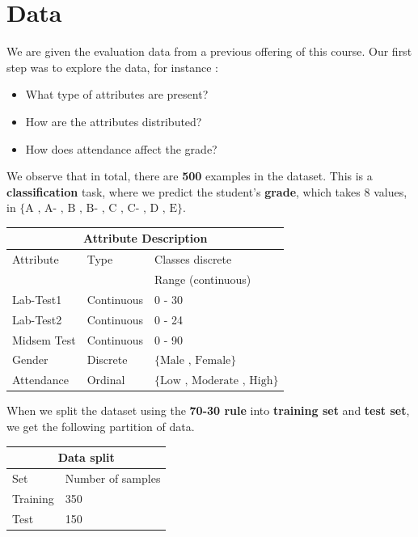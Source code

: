 \section{Data}

We are given the evaluation data from a previous offering of this course. Our first step was to explore the data, for instance :

\begin{itemize}
    \item What type of attributes are present?
    \item How are the attributes distributed?
    \item How does attendance affect the grade?
\end{itemize}


We observe that in total, there are \textbf{500} examples in the dataset. This is a \textbf{classification} task, where we predict the student's \textbf{grade}, which takes $8$ values, in $\{\text{A , A- , B , B- , C , C- , D , E}\}$. \\

\begin{tabular}{ |p{3cm}||p{3cm}|p{5cm}|}
\hline
\multicolumn{3}{|c|}{Attribute Description}\\
\hline
Attribute& Type &  Classes {discrete} \\
 & & Range (continuous)\\
\hline
Lab-Test1  &  Continuous& 0 - 30  \\
Lab-Test2 & Continuous  & 0 - 24 \\
Midsem Test & Continuous& 0 - 90\\
Gender    &Discrete & $\{\text{Male , Female}\}$\\
Attendance& Ordinal & $\{ \text{Low  ,  Moderate , High}\}$\\
\hline
\end{tabular}\newline \newline


When we split the dataset using the \textbf{70-30 rule}  into \textbf{training set} and \textbf{test set}, we get the following partition of data.\\


\begin{center}
\begin{tabular}{ |p{3cm}||p{5cm}|}
\hline
\multicolumn{2}{|c|}{Data split}\\
\hline
Set& Number of samples \\
\hline
Training &  350 \\
Test & 150 \\
\hline
\end{tabular}
\end{center} \\

